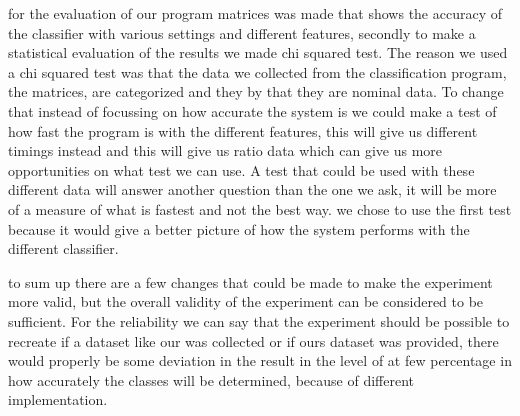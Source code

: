 
for the evaluation of our program matrices was made that shows the accuracy of the classifier with various settings and different features, secondly to make a statistical evaluation of the results we made chi squared test. The reason we used a chi squared test was that the data we collected from the classification program, the matrices, are categorized and they by that they are nominal data. To change that instead of focussing on how accurate the system is we could make a test of how fast the program is with the different features, this will give us different timings instead and this will give us ratio data which can give us more opportunities on what test we can use. A test that could be used with these different data will answer another question than the one we ask, it will be more of a measure of what is fastest and not the best way. we chose to use the first test because it would give a better picture of how the system performs with the different classifier.


to sum up there are a few changes that could be made to make the experiment more valid, but the overall validity of the experiment can be considered to be sufficient. For the reliability we can say that the experiment should be possible to recreate if a dataset like our was collected or if ours dataset was provided, there would properly be some deviation in the result in the level of at few percentage in how accurately the classes will be determined, because of different implementation.